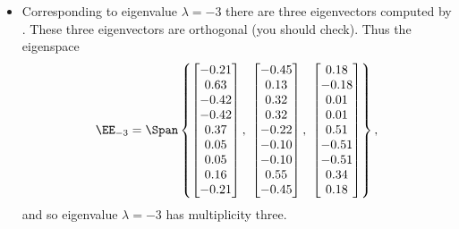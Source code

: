 \begin{example}
\begin{solution}
\begin{itemize}
\item Corresponding to eigenvalue \(\lambda=-3\) there are three eigenvectors computed by \script.
These three eigenvectors are orthogonal (you should check).
Thus the eigenspace
\begin{equation*}
\EE_{-3}=\Span\left\{ 
\begin{bmatrix} -0.21\\0.63\\-0.42\\-0.42\\0.37\\0.05\\0.05\\0.16\\-0.21
\end{bmatrix},\  
\begin{bmatrix} -0.45\\0.13\\0.32\\0.32\\-0.22\\-0.10\\-0.10\\0.55\\-0.45
\end{bmatrix},\ 
\begin{bmatrix} 0.18\\-0.18\\0.01\\0.01\\0.51\\-0.51\\-0.51\\0.34\\0.18
 \end{bmatrix} \right\},
\end{equation*}
and so eigenvalue \(\lambda=-3\) has multiplicity three.


\end{itemize}
\end{solution}
\end{example}
